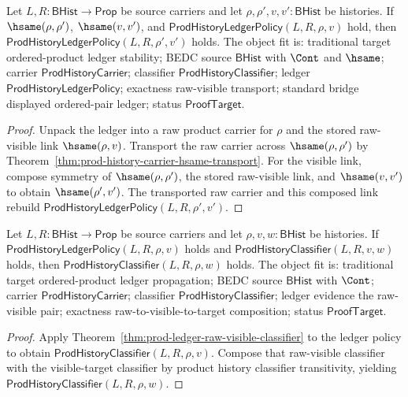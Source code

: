 \begin{theorem}
\label{thm:prod-ledger-hsame-transport}
Let $L,R:\mathsf{BHist}\to\mathsf{Prop}$ be source carriers and let
$\rho,\rho',v,v':\mathsf{BHist}$ be histories. If $\hsame(\rho,\rho')$,
$\hsame(v,v')$, and $\mathsf{ProdHistoryLedgerPolicy}(L,R,\rho,v)$ hold, then
$\mathsf{ProdHistoryLedgerPolicy}(L,R,\rho',v')$ holds. The object fit is:
traditional target ordered-product ledger stability; BEDC source
$\mathsf{BHist}$ with $\Cont$ and $\hsame$; carrier
$\mathsf{ProdHistoryCarrier}$; classifier $\mathsf{ProdHistoryClassifier}$;
ledger $\mathsf{ProdHistoryLedgerPolicy}$; exactness raw-visible transport;
standard bridge displayed ordered-pair ledger; status $\mathsf{ProofTarget}$.
\end{theorem}
\begin{proof}
Unpack the ledger into a raw product carrier for $\rho$ and the stored
raw-visible link $\hsame(\rho,v)$. Transport the raw carrier across
$\hsame(\rho,\rho')$ by Theorem~\ref{thm:prod-history-carrier-hsame-transport}.
For the visible link, compose symmetry of $\hsame(\rho,\rho')$, the stored
raw-visible link, and $\hsame(v,v')$ to obtain $\hsame(\rho',v')$. The
transported raw carrier and this composed link rebuild
$\mathsf{ProdHistoryLedgerPolicy}(L,R,\rho',v')$.
\end{proof}

\begin{theorem}
\label{thm:prod-ledger-classifier-extension}
Let $L,R:\mathsf{BHist}\to\mathsf{Prop}$ be source carriers and let
$\rho,v,w:\mathsf{BHist}$ be histories. If
$\mathsf{ProdHistoryLedgerPolicy}(L,R,\rho,v)$ holds and
$\mathsf{ProdHistoryClassifier}(L,R,v,w)$ holds, then
$\mathsf{ProdHistoryClassifier}(L,R,\rho,w)$ holds. The object fit is:
traditional target ordered-product ledger propagation; BEDC source
$\mathsf{BHist}$ with $\Cont$; carrier $\mathsf{ProdHistoryCarrier}$;
classifier $\mathsf{ProdHistoryClassifier}$; ledger evidence the raw-visible
pair; exactness raw-to-visible-to-target composition; status
$\mathsf{ProofTarget}$.
\end{theorem}
\begin{proof}
Apply Theorem~\ref{thm:prod-ledger-raw-visible-classifier} to the ledger
policy to obtain $\mathsf{ProdHistoryClassifier}(L,R,\rho,v)$. Compose that
raw-visible classifier with the visible-target classifier by product history
classifier transitivity, yielding
$\mathsf{ProdHistoryClassifier}(L,R,\rho,w)$.
\end{proof}

